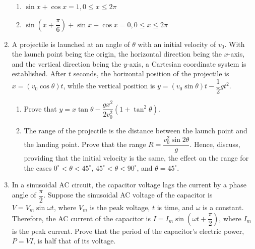\documentclass{report}
\begin{document}
\begin{enumerate}
	      \begin{enumerate}
	      	\item $\sin x + \cos x = 1, 0 \leq x \leq 2 \pi$
	      	\item $\sin \left(x + \dfrac{\pi}{6}\right) + \sin x + \cos x = 0, 0 \leq x \leq 2 \pi$
	      \end{enumerate}
	      
	\item A projectile is launched at an angle of $\theta$ with an initial velocity of $v_0$. With the launch point being the origin, the horizontal direction being the $x$-axis, and the vertical direction being the $y$-axis, a Cartesian coordinate system is established. After $t$ seconds, the horizontal position of the projectile is $x = \left(v_0 \cos \theta\right) t$, while the vertical position is $y = \left(v_0 \sin \theta\right) t - \dfrac{1}{2} gt^2$.
	      
	      \begin{enumerate}
	      	\item Prove that $y = x \tan \theta - \dfrac{g x^2}{2 v_0^2} \left(1 + \tan^2 \theta\right)$.
	      	          
	      	\item The range of the projectile is the distance between the launch point and the landing point. Prove that the range $R = \dfrac{v_0^2 \sin 2 \theta}{g}$. Hence, discuss, providing that the initial velocity is the same, the effect on the range for the cases $0^{\circ} < \theta < 45^{\circ}$, $45^{\circ} < \theta < 90^{\circ}$, and $\theta = 45^{\circ}$.
	      \end{enumerate}
	      
	\item In a sinusoidal AC circuit, the capacitor voltage lags the current by a phase angle of $\dfrac{\pi}{2}$. Suppose the sinusoidal AC voltage of the capacitor is $V = V_m \sin \omega t$, where $V_m$ is the peak voltage, $t$ is time, and $\omega$ is a constant. Therefore, the AC current of the capacitor is $I = I_m \sin \left(\omega t + \dfrac{\pi}{2}\right)$, where $I_m$ is the peak current. Prove that the period of the capacitor's electric power, $P = VI$, is half that of its voltage.
\end{enumerate}
\end{document}

